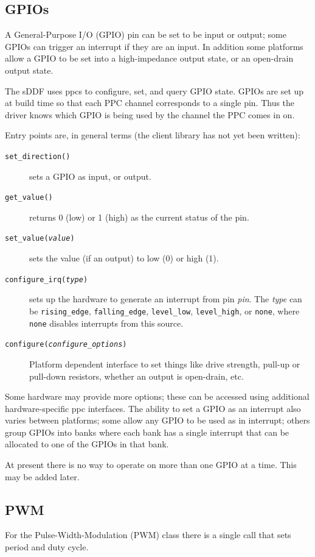 \documentclass[a4paper,12pt]{report}
\begin{document}
\subsection{GPIOs}\label{s:gpio}
A General-Purpose I/O (GPIO) pin can be set to be input or
output; some GPIOs can trigger an interrupt if they are an input. In
addition some platforms allow a GPIO to be set into a high-impedance
output state, or an open-drain output state.

The sDDF uses \gls{ppc}s to configure, set, and query GPIO state.  GPIOs are
set up at build time so that each PPC channel corresponds to a
single pin.  Thus the driver knows which GPIO is being used by the
channel the PPC comes in on.

Entry points are, in general terms (the client library has not yet
been written):
\begin{description}
\item[\texttt{set\_direction()}]
  sets a GPIO as input, or output.
\item[\texttt{get\_value()}] returns 0 (low) or 1 (high) as
  the current status of the pin.
\item[\texttt{set\_value(\emph{value})}] sets the value
  (if an output) to low (0) or high (1).
\item[\texttt{configure\_irq(\emph{type})}] sets up the
  hardware to generate an interrupt from pin \emph{pin}.  The
  \emph{type} can be \texttt{rising\_edge}, \texttt{falling\_edge},
  \texttt{level\_low}, \texttt{level\_high}, or \texttt{none}, where
  \texttt{none} disables interrupts from this source.
\item[\texttt{configure(\emph{configure\_options})}] Platform
  dependent interface to set things like drive strength, pull-up or
  pull-down resistors, whether an output is open-drain, etc.
\end{description}

Some hardware may provide more options; these can be accessed
using additional hardware-specific \gls{ppc} interfaces.  The
ability to set a GPIO as an interrupt also varies between platforms;
some allow any GPIO to be used as in interrupt; others group GPIOs
into banks where each bank has a single interrupt that can be
allocated to one of the GPIOs in that bank.

At present there is no way to operate on more than one GPIO at a time.
This may be added later.

\subsection{PWM}\label{s:pwm}
For the Pulse-Width-Modulation (PWM) class there is
a single call that sets period and duty cycle.
\end{document}
